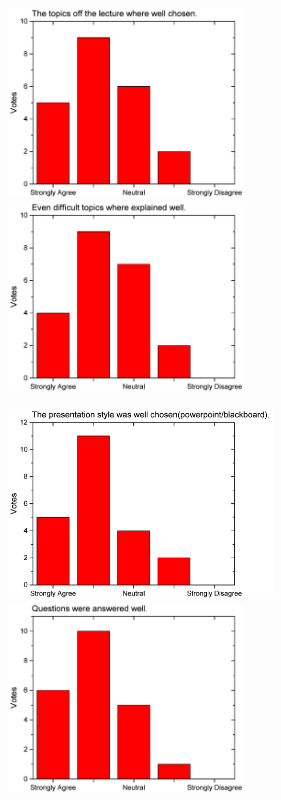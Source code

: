 \begin{figure}[H]
  \begin{minipage}{.48\linewidth}
    \centering
      {\includegraphics[height=50mm]{figures/n/Graph47.pdf}}
      {\includegraphics[height=50mm]{figures/n/Graph48.pdf}}
  \end{minipage}\quad
  \begin{minipage}{.48\linewidth}
    \centering
      {\includegraphics[height=50mm]{figures/n/Graph49.pdf}}
      {\includegraphics[height=50mm]{figures/n/Graph50.pdf}}
  \end{minipage}
\end{figure}

